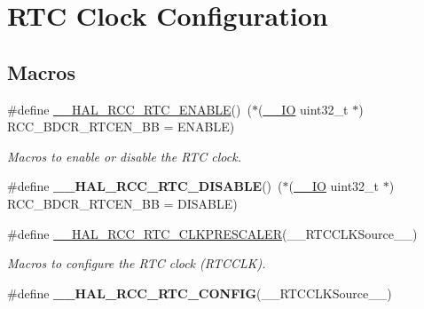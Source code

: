 \hypertarget{group___r_c_c___internal___r_t_c___clock___configuration}{}\section{R\+TC Clock Configuration}
\label{group___r_c_c___internal___r_t_c___clock___configuration}
\subsection*{Macros}
\begin{DoxyCompactItemize}
\item 
\#define \mbox{\hyperlink{group___r_c_c___internal___r_t_c___clock___configuration_gab7cc36427c31da645a0e38e181f8ce0f}{\+\_\+\+\_\+\+H\+A\+L\+\_\+\+R\+C\+C\+\_\+\+R\+T\+C\+\_\+\+E\+N\+A\+B\+LE}}()~($\ast$(\mbox{\hyperlink{core__sc300_8h_aec43007d9998a0a0e01faede4133d6be}{\+\_\+\+\_\+\+IO}} uint32\+\_\+t $\ast$) R\+C\+C\+\_\+\+B\+D\+C\+R\+\_\+\+R\+T\+C\+E\+N\+\_\+\+BB = E\+N\+A\+B\+LE)
\begin{DoxyCompactList}\small\item\em Macros to enable or disable the R\+TC clock. \end{DoxyCompactList}\item 
\mbox{\label{group___r_c_c___internal___r_t_c___clock___configuration_gaab5eeb81fc9f0c8d4450069f7a751855}} 
\#define {\bfseries \+\_\+\+\_\+\+H\+A\+L\+\_\+\+R\+C\+C\+\_\+\+R\+T\+C\+\_\+\+D\+I\+S\+A\+B\+LE}()~($\ast$(\mbox{\hyperlink{core__sc300_8h_aec43007d9998a0a0e01faede4133d6be}{\+\_\+\+\_\+\+IO}} uint32\+\_\+t $\ast$) R\+C\+C\+\_\+\+B\+D\+C\+R\+\_\+\+R\+T\+C\+E\+N\+\_\+\+BB = D\+I\+S\+A\+B\+LE)
\item 
\#define \mbox{\hyperlink{group___r_c_c___internal___r_t_c___clock___configuration_ga7e10e306e7d9f3cd59d30dcb2c9cf61d}{\+\_\+\+\_\+\+H\+A\+L\+\_\+\+R\+C\+C\+\_\+\+R\+T\+C\+\_\+\+C\+L\+K\+P\+R\+E\+S\+C\+A\+L\+ER}}(\+\_\+\+\_\+\+R\+T\+C\+C\+L\+K\+Source\+\_\+\+\_\+)
\begin{DoxyCompactList}\small\item\em Macros to configure the R\+TC clock (R\+T\+C\+C\+LK). \end{DoxyCompactList}\item 
\#define {\bfseries \+\_\+\+\_\+\+H\+A\+L\+\_\+\+R\+C\+C\+\_\+\+R\+T\+C\+\_\+\+C\+O\+N\+F\+IG}(\+\_\+\+\_\+\+R\+T\+C\+C\+L\+K\+Source\+\_\+\+\_\+)
\item 

\end{DoxyCompactItemize}

